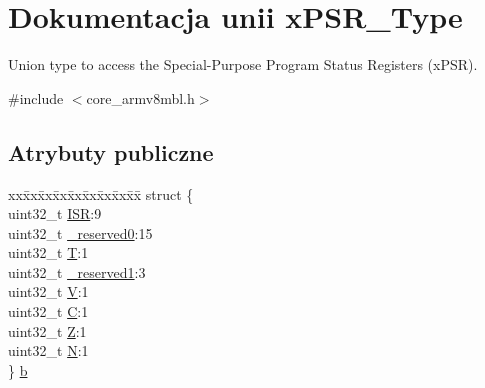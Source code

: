 \hypertarget{unionx_p_s_r___type}{}\section{Dokumentacja unii x\+P\+S\+R\+\_\+\+Type}
\label{unionx_p_s_r___type}


Union type to access the Special-\/\+Purpose Program Status Registers (x\+P\+SR).  




{\ttfamily \#include $<$core\+\_\+armv8mbl.\+h$>$}

\subsection*{Atrybuty publiczne}
\begin{DoxyCompactItemize}
\item 
\begin{tabbing}
xx\=xx\=xx\=xx\=xx\=xx\=xx\=xx\=xx\=\kill
struct \{\\
\>uint32\_t \hyperlink{unionx_p_s_r___type_a3e9120dcf1a829fc8d2302b4d0673970}{ISR}:9\\
\>uint32\_t \hyperlink{unionx_p_s_r___type_af438e0f407357e914a70b5bd4d6a97c5}{\_reserved0}:15\\
\>uint32\_t \hyperlink{unionx_p_s_r___type_a7eed9fe24ae8d354cd76ae1c1110a658}{T}:1\\
\>uint32\_t \hyperlink{unionx_p_s_r___type_a790056bb6f20ea16cecc784b0dd19ad6}{\_reserved1}:3\\
\>uint32\_t \hyperlink{unionx_p_s_r___type_af14df16ea0690070c45b95f2116b7a0a}{V}:1\\
\>uint32\_t \hyperlink{unionx_p_s_r___type_a40213a6b5620410cac83b0d89564609d}{C}:1\\
\>uint32\_t \hyperlink{unionx_p_s_r___type_a1e5d9801013d5146f2e02d9b7b3da562}{Z}:1\\
\>uint32\_t \hyperlink{unionx_p_s_r___type_a2db9a52f6d42809627d1a7a607c5dbc5}{N}:1\\
\} \hyperlink{unionx_p_s_r___type_a3b1063bb5cdad67e037cba993b693b70}{b}\\


\end{tabbing}
\end{DoxyCompactItemize}
